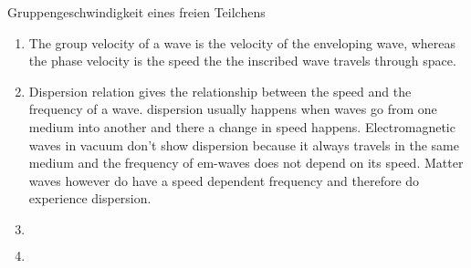 \documentclass{alex_hü}
\begin{document}
\begin{mybox}{Gruppengeschwindigkeit eines freien Teilchens}
	\centering \(  \)
	\tcblower
	\begin{enumerate}
		\item The group velocity of a wave is the velocity of the enveloping wave, whereas the phase velocity is the speed the the inscribed wave travels through space.
	\tcbline
		\item Dispersion relation gives the relationship between the speed and the frequency of a wave. dispersion usually happens when waves go from one medium into another and there a change in speed happens. Electromagnetic waves in vacuum don't show dispersion because it always travels in the same medium and the frequency of em-waves does not depend on its speed. Matter waves however do have a speed dependent frequency and therefore do experience dispersion. 
	\tcbline
		\item \(  \)
	\tcbline
		\item 
%			
	\end{enumerate}
\end{mybox}
\end{document}
